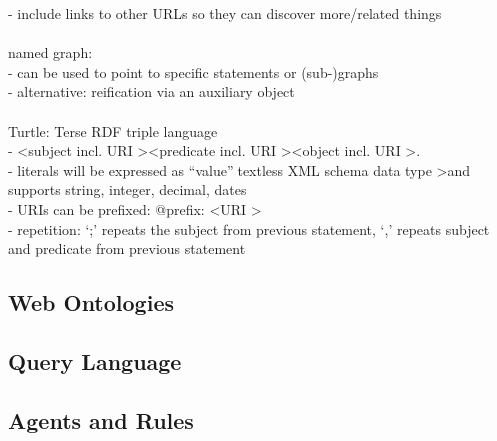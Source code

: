 - include links to other URLs so they can discover more/related things \\
\\
named graph: \\
- can be used to point to specific statements or (sub-)graphs \\
- alternative: reification via an auxiliary object \\
\\
Turtle: Terse RDF triple language \\
- \textless subject incl. URI \textgreater \textless predicate incl. URI \textgreater \textless object incl. URI \textgreater . \\
- literals will be expressed as ``value''^^\textless XML schema data type \textgreater and supports string, integer, decimal, dates \\
- URIs can be prefixed: @prefix: \textless URI \textgreater \\
- repetition: `;' repeats the subject from previous statement, `,' repeats subject and predicate from previous statement \\


\subsection{Web Ontologies}
\label{sec:semantic_ontologies}



\subsection{Query Language}
\label{sec:semantic_querylang}



\subsection{Agents and Rules}
\label{sec:semantic_logic_rules}



